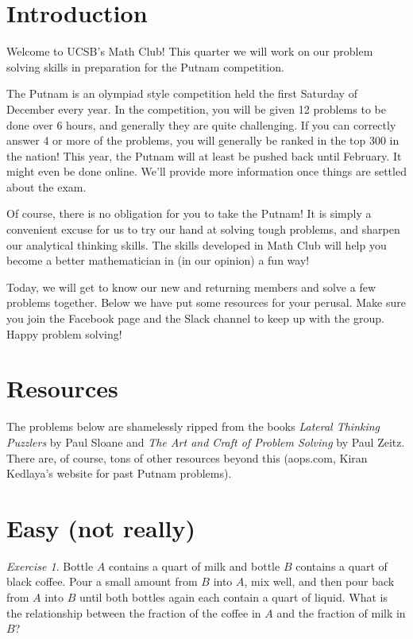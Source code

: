 \documentclass{article}
\theoremstyle{definition}
\theoremstyle{remark}
\newtheorem{exercise}{Exercise}
\begin{document}
\section{Introduction}

Welcome to UCSB's Math Club! This quarter we will work on our problem solving skills in preparation for the Putnam competition. 

The Putnam is an olympiad style competition held the first Saturday of December every year. In the competition, you will be given 12 problems to be done over 6 hours, and generally they are quite challenging. If you can correctly answer 4 or more of the problems, you will generally be ranked in the top 300 in the nation! This year, the Putnam will at least be pushed back until February. It might even be done online. We'll provide more information once things are settled about the exam.

Of course, there is no obligation for you to take the Putnam! It is simply a convenient excuse for us to try our hand at solving tough problems, and sharpen our analytical thinking skills. The skills developed in Math Club will help you become a better mathematician in (in our opinion) a fun way! 

Today, we will get to know our new and returning members and solve a few problems together. Below we have put some resources for your perusal. Make sure you join the Facebook page and the Slack channel to keep up with the group. Happy problem solving!

\section{Resources}

The problems below are shamelessly ripped from the books \textit{Lateral Thinking Puzzlers} by Paul Sloane and \textit{The Art and Craft of Problem Solving} by Paul Zeitz. There are, of course, tons of other resources beyond this (aops.com, Kiran Kedlaya's website for past Putnam problems).

\section{Easy (not really)}

\begin{exercise}
Bottle $A$ contains a quart of milk and bottle $B$ contains a quart of black coffee. Pour a small amount from $B$ into $A$, mix well, and then pour back from $A$ into $B$ until both bottles again each contain a quart of liquid. What is the relationship between the fraction of the coffee in $A$ and the fraction of milk in $B$?
\end{exercise}
\end{document}
